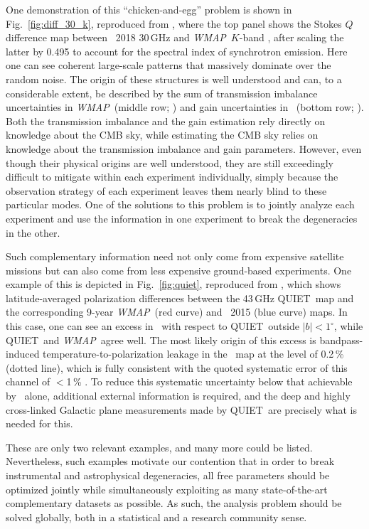 \documentclass[twocolumn]{aa}
\def\WMAP{\textit{WMAP}}
\begin{document}
One demonstration of this ``chicken-and-egg'' problem is shown in Fig.~\ref{fig:diff_30_k}, reproduced from \citet{bp07}, where the top panel shows the Stokes $Q$ difference map between \Planck\ 2018 30\,GHz \citep{planck2016-l02} and \WMAP\ $K$-band \citep{bennett2012}, after scaling the latter by 0.495 to account for the spectral index of synchrotron emission. Here one can see coherent large-scale patterns that massively dominate over the random noise. The origin of these structures is well understood and can, to a considerable extent, be described by the sum of transmission imbalance uncertainties in \WMAP\ (middle row; \citealp{jarosik2007}) and gain uncertainties in \Planck\ (bottom row; \citealp{planck2016-l02}). Both the transmission imbalance and the gain estimation rely directly on knowledge about the CMB sky, while estimating the CMB sky relies on knowledge about the transmission imbalance and gain parameters. However, even though their physical origins are well understood, they are still exceedingly difficult to mitigate within each experiment individually, simply because the observation strategy of each experiment leaves them nearly blind to these particular modes. One of the solutions to this problem is to jointly analyze each experiment and use the information in one experiment to break the degeneracies in the other.

Such complementary information need not only come from expensive satellite missions but can also come from less expensive ground-based experiments. One example of this is depicted in Fig.~\ref{fig:quiet}, reproduced from \citet{ruud:2015}, which shows latitude-averaged polarization differences between the 43\,GHz QUIET\ map and the corresponding 9-year \WMAP\ (red curve) and \Planck\ 2015 (blue curve) maps. In this case, one can see an excess in \Planck\ with respect to QUIET\  outside $|b|<1^{\circ}$, while QUIET\ and \WMAP\ agree well. The most likely origin of this excess is bandpass-induced temperature-to-polarization leakage \citep{ruud:2015,bp09} in the \Planck\ map at the level of 0.2\,\% (dotted line), which is fully consistent with the quoted systematic error of this channel of $<$1\,\% \citep{planck2014-a04}. To reduce this systematic uncertainty below that achievable by \Planck\ alone, additional external information is required, and the deep and highly cross-linked Galactic plane measurements made by QUIET\ are precisely what is needed for this.

These are only two relevant examples, and many more could be listed. Nevertheless, such examples motivate our contention that in order to break instrumental and astrophysical degeneracies, all free parameters should be optimized jointly while simultaneously exploiting as many state-of-the-art complementary datasets as possible. As such, the analysis problem should be solved globally, both in a statistical and a research community sense. 
\end{document}
